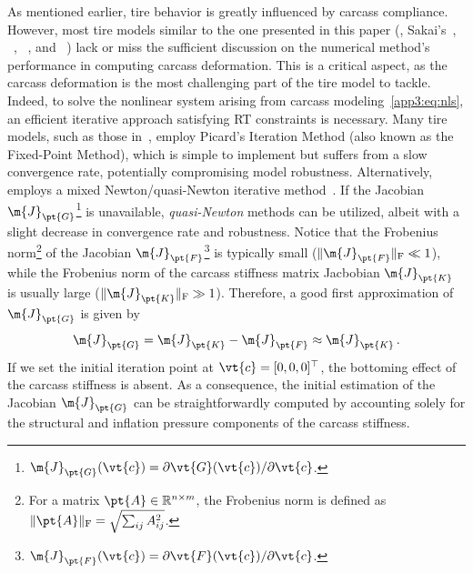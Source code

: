 As mentioned earlier, tire behavior is greatly influenced by carcass compliance. However, most tire models similar to the one presented in this paper (\ie{}, Sakai's~\cite{sakai1981theoreticalI, sakai1981theoreticalII, sakai1981theoreticalIII, sakai1982theoreticalIV}, \NeoFiala{}~\cite{miyashita2003analytical, miyashita2006new, kabe2006new, miyashita2015study, miyashita2010tire}, \TreadSim{}~\cite{dehoogh2005implementing}, and \TaMeTire{}~\cite{fevrier2013method}) lack or miss the sufficient discussion on the numerical method's performance in computing carcass deformation. This is a critical aspect, as the carcass deformation is the most challenging part of the tire model to tackle. Indeed, to solve the nonlinear system arising from carcass modeling~\eqref{app3:eq:nls}, an efficient iterative approach satisfying \ac{RT} constraints is necessary. Many tire models, such as those in~\cite{gruber2012normalI, gruber2012normalII, miyashita2010tire, miyashita2003analytical, miyashita2006new, kabe2006new, miyashita2015study}, employ Picard's Iteration Method (also known as the Fixed-Point Method), which is simple to implement but suffers from a slow convergence rate, potentially compromising model robustness. Alternatively, \TaMeTire{} employs a mixed Newton/quasi-Newton iterative method~\cite{fevrier2013method}. If the Jacobian $\m{J}_\pt{G}$\footnote{$\m{J}_\pt{G}(\vt{c}) = \partial\vt{G}(\vt{c})/\partial\vt{c}$.} is unavailable, \emph{quasi-Newton} methods can be utilized, albeit with a slight decrease in convergence rate and robustness. Notice that the Frobenius norm\footnote{For a matrix $\pt{A}\in\mathbb{R}^{n \times m}$, the Frobenius norm is defined as $\|\pt{A}\|_\mathrm{F}=\sqrt{\sum_{ij}A_{ij}^2}$.} of the Jacobian $\m{J}_\pt{F}$\footnote{$\m{J}_\pt{F}(\vt{c}) = \partial\vt{F}(\vt{c})/\partial\vt{c}$.} is typically small ($\|\m{J}_\pt{F}\|_\mathrm{F} \ll 1$), while the Frobenius norm of the carcass stiffness matrix Jacbobian $\m{J}_\pt{K}$ is usually large ($\|\m{J}_\pt{K}\|_\mathrm{F} \gg 1$). Therefore, a good first approximation of $\m{J}_\pt{G}$ is given by
%
\begin{equation*}
  \m{J}_\pt{G} = \m{J}_\pt{K} - \m{J}_\pt{F} \approx \m{J}_\pt{K} \, \text{.}
\end{equation*}
%
If we set the initial iteration point at $\vt{c} = [0,0,0]^\top$, the bottoming effect of the carcass stiffness is absent. As a consequence, the initial estimation of the Jacobian $\m{J}_\pt{G}$ can be straightforwardly computed by accounting solely for the structural and inflation pressure components of the carcass stiffness.

